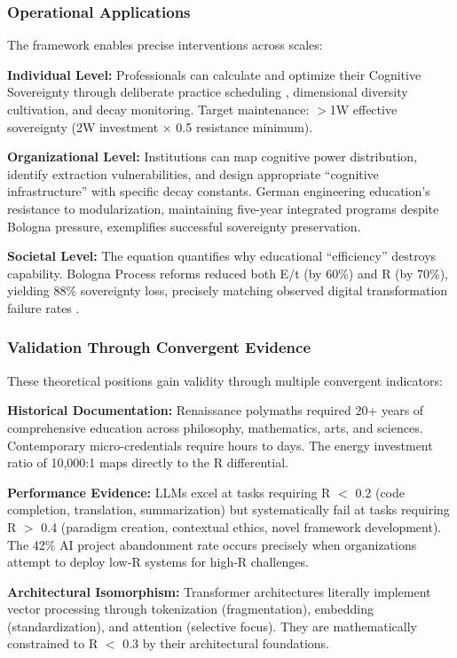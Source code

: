 \subsubsection{Operational Applications}

The framework enables precise interventions across scales:

\textbf{Individual Level:} Professionals can calculate and optimize their Cognitive Sovereignty through deliberate practice scheduling \citep{ericsson1993}, dimensional diversity cultivation, and decay monitoring. Target maintenance: $>$1W effective sovereignty (2W investment $\times$ 0.5 resistance minimum).

\textbf{Organizational Level:} Institutions can map cognitive power distribution, identify extraction vulnerabilities, and design appropriate ``cognitive infrastructure'' with specific decay constants. German engineering education's resistance to modularization, maintaining five-year integrated programs despite Bologna pressure, exemplifies successful sovereignty preservation.

\textbf{Societal Level:} The equation quantifies why educational ``efficiency'' destroys capability. Bologna Process reforms reduced both E/t (by 60\%) and R (by 70\%), yielding 88\% sovereignty loss, precisely matching observed digital transformation failure rates \citep{bain2024}.

\subsubsection{Validation Through Convergent Evidence}

These theoretical positions gain validity through multiple convergent indicators:

\textbf{Historical Documentation:} Renaissance polymaths required 20+ years of comprehensive education across philosophy, mathematics, arts, and sciences. Contemporary micro-credentials require hours to days. The energy investment ratio of 10,000:1 maps directly to the R differential.

\textbf{Performance Evidence:} LLMs excel at tasks requiring R $<$ 0.2 (code completion, translation, summarization) but systematically fail at tasks requiring R $>$ 0.4 (paradigm creation, contextual ethics, novel framework development). The 42\% AI project abandonment rate occurs precisely when organizations attempt to deploy low-R systems for high-R challenges.

\textbf{Architectural Isomorphism:} Transformer architectures literally implement vector processing through tokenization (fragmentation), embedding (standardization), and attention (selective focus). They are mathematically constrained to R $<$ 0.3 by their architectural foundations.

